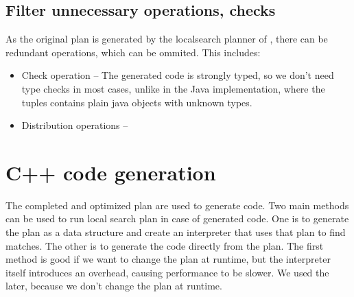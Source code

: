 \subsection{Filter unnecessary operations, checks}
As the original plan is generated by the localsearch planner of \viatra{}, there can be redundant operations, which can be ommited. This includes:

\begin{itemize}
	\item Check operation -- The generated code is strongly typed, so we don't need type checks in most cases, unlike in the Java implementation, where the tuples contains plain java objects with unknown types.
	
	\item Distribution operations -- 
\end{itemize}



\section{C++ code generation}

The completed and optimized plan are used to generate \cpp{} code. 
Two main methods can be used to run local search plan in case of generated code. 
One is to generate the plan as a data structure and create an interpreter that uses that plan to find matches. 
The other is to generate the code directly from the plan. 
The first method is good if we want to change the plan at runtime, but the interpreter itself introduces an overhead, causing performance to be slower.
We used the later, because we don't change the plan at runtime.












